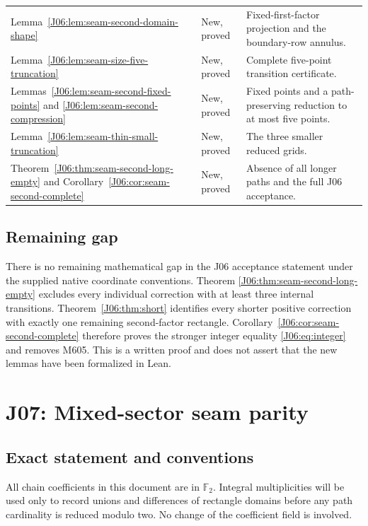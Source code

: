 \documentclass[11pt,oneside]{report}
\theoremstyle{definition}
\numberwithin{equation}{section}
\newcommand{\F}{\mathbb F_2}
\begin{document}
\begin{longtable}{@{}>{\raggedright\arraybackslash}p{}>{\raggedright\arraybackslash}p{}>{\raggedright\arraybackslash}p{}@{}}
Lemma~\ref{J06:lem:seam-second-domain-shape}
& New, proved & Fixed-first-factor projection and the boundary-row annulus.\\
Lemma~\ref{J06:lem:seam-size-five-truncation}
& New, proved & Complete five-point transition certificate.\\
Lemmas~\ref{J06:lem:seam-second-fixed-points} and
\ref{J06:lem:seam-second-compression}
& New, proved & Fixed points and a path-preserving reduction to at most five points.\\
Lemma~\ref{J06:lem:seam-thin-small-truncation}
& New, proved & The three smaller reduced grids.\\
Theorem~\ref{J06:thm:seam-second-long-empty} and
Corollary~\ref{J06:cor:seam-second-complete}
& New, proved & Absence of all longer paths and the full J06 acceptance.\\
\bottomrule
\end{longtable}
\normalsize

\section{Remaining gap}

There is no remaining mathematical gap in the J06 acceptance statement
under the supplied native coordinate conventions. Theorem
\ref{J06:thm:seam-second-long-empty} excludes every individual correction
with at least three internal transitions. Theorem~\ref{J06:thm:short}
identifies every shorter positive correction with exactly one remaining
second-factor rectangle. Corollary~\ref{J06:cor:seam-second-complete}
therefore proves the stronger integer equality \eqref{J06:eq:integer}
and removes M605. This is a written proof and does not assert that the
new lemmas have been formalized in Lean.



\chapter{J07: Mixed-sector seam parity}
\label{chapter:J07}



\section{Exact statement and conventions}

All chain coefficients in this document are in $\F$.
Integral multiplicities will be used only to record unions and differences
of rectangle domains before any path cardinality is reduced modulo two.
No change of the coefficient field is involved.
\end{document}
